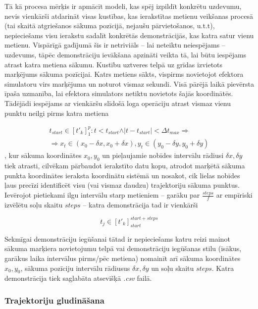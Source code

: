 \documentclass[12pt, a4paper]{article}
\numberwithin{equation}{section} %
\begin{document}
Tā kā procesa mērķis ir apmācīt modeli, kas spēj izpildīt konkrētu uzdevumu, nevis vienkārši atdarināt visas kustības, kas ierakstītas metienu veikšanas procesā (tai skaitā atgriešanos sākuma pozīcijā, nejaušu pārvietošanos, u.t.t), nepieciešams visu ierakstu sadalīt konkrētās demonstrācijās, kas katra satur vienu metienu. Vispārīgā gadījumā šis ir netriviāls -- lai neteiktu neiespējams -- uzdevums, tāpēc demonstrāciju ievākšana apzināti veikta tā, lai būtu iespējams atrast katra metiena sākumu. Kustību uztveres telpā uz grīdas izvietots marķējums sākuma pozīcijai. Katrs metiens sākts, vispirms novietojot efektora simulatoru virs marķējuma un noturot vismaz sekundi. Visā pārējā laikā pievērsta īpaša uzmanība, lai efektora simulators netiktu novietots šajās koordinātēs. Tādējādi iespējams ar vienkāršu slīdošā loga operāciju atrast vismaz vienu punktu neilgi pirms katra metiena

\begin{multline}
    t_{start} \in [t'_{k}]^p_1: t < t_{start} \land \vert t - t_{start} \vert < \Delta t_{max} \Rightarrow \\ \Rightarrow x_t \in (x_{0} - \delta x, x_{0} + \delta x ), y_t \in  (y_{0} - \delta y, y_{0} + \delta y )
\end{multline}
, kur sākuma koordinātes $x_0, y_0$ un pieļaujamie nobīdes intervālu rādiusi $\delta x, \delta y$ tiek atrasti, cilvēkam pārbaudot ierakstīto datu kopu, atrodot marķētā sākuma punkta koordinātes ieraksta koordinātu sistēmā un nosakot, cik lielas nobīdes ļaus precīzi identificēt visu (vai vismaz daudzu) trajektoriju sākuma punktus. Ievērojot pietiekami ilgu intervālu starp metieniem -- garāku par $\frac{steps}{f}$ ar empīriski izvēlētu soļu skaitu $steps$ --  katra demonstrācija tad ir vienkārši 

\begin{equation}
    t_{j} \in [t'_{k}]^{start+steps}_{start}
\end{equation}

Sekmīgai demonstrāciju iegūšanai tātad ir nepieciešams katru reizi mainot sākuma marķiera novietojumu telpā vai demonstrāciju iegūšanas stilu (īsākus, garākus laika intervālus pirms/pēc metiena) nomainīt arī sākuma koordinātes $x_0, y_0$, sākuma pozīciju intervālu rādiusus $\delta x, \delta y$ un soļu skaitu $steps$. Katra demonstrācija tiek saglabāta atsevišķā \textit{.csv} failā.

\subsubsection{Trajektoriju gludināšana}
\end{document}
